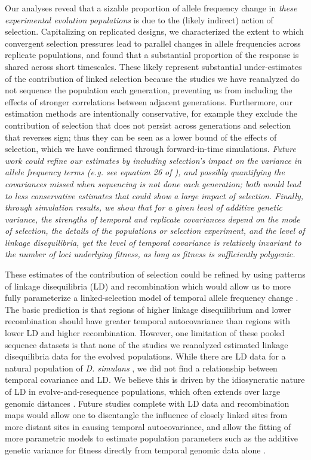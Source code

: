 \documentclass[9pt,twocolumn,twoside]{pnas-new}
\newcommand{\vb}[1]{{\it \color{red} #1}}
\begin{document}
Our analyses reveal that a sizable proportion of allele frequency change in
\vb{these experimental evolution populations} is due to the (likely indirect)
action of selection. Capitalizing on replicated designs, we characterized the
extent to which convergent selection pressures lead to parallel changes in
allele frequencies across replicate populations, and found that a substantial
proportion of the response is shared across short timescales.  These likely
represent substantial under-estimates of the contribution of linked selection
because the studies we have reanalyzed do not sequence the population each
generation, preventing us from including the effects of stronger correlations
between adjacent generations. Furthermore, our estimation methods are
intentionally conservative, for example they exclude the contribution of
selection that does not persist across generations and selection that reverses
sign; thus they can be seen as a lower bound of the effects of selection, which
we have confirmed through forward-in-time simulations.  \vb{Future work could
  refine our estimates by including selection's impact on the variance in
  allele frequency terms (e.g. see equation 26 of \textcite{Buffalo2019-io}),
  and possibly quantifying the covariances missed when sequencing is not done
  each generation; both would lead to less conservative estimates that could
  show a large impact of selection.  Finally, through simulation results, we
  show that for a given level of additive genetic variance, the strengths of
  temporal and replicate covariances depend on the mode of selection, the
  details of the populations or selection experiment, and the level of linkage
disequilibria, yet the level of temporal covariance is relatively invariant to
the number of loci underlying fitness, as long as fitness is sufficiently
polygenic.} 

These estimates of the contribution of selection could be refined by using
patterns of linkage disequilibria (LD) and recombination which would allow
us to more fully parameterize a linked-selection model of temporal allele
frequency change \cite{Buffalo2019-io}. The basic prediction is that
regions of higher linkage disequilibrium and lower recombination should have
greater temporal autocovariance than regions with lower LD and higher
recombination. However, one limitation of these pooled sequence datasets is
that none of the studies we reanalyzed estimated linkage disequilibria data for
the evolved populations.  While there are LD data for a natural population of
\emph{D. simulans} \cite{Signor2018-wg,Howie2018-ay},  we did not find a
relationship between temporal covariance and LD.  We believe this is driven by
the idiosyncratic nature of LD in evolve-and-resequence populations, which
often extends over large genomic distances
\cite{Nuzhdin2013-gf,Kelly2019-dc}. Future studies complete with LD data
and recombination maps would allow one to disentangle the influence of closely
linked sites from more distant sites in causing temporal autocovariance, and
allow the fitting of more parametric models to estimate population parameters
such as the additive genetic variance for fitness directly from temporal
genomic data alone \cite{Buffalo2019-io}.
\end{document}
